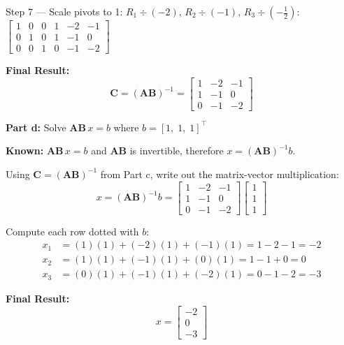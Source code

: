 \documentclass{article}
\begin{document}
\begin{aprob}
    \medskip
    Step 7 --- Scale pivots to 1: $R_1 \div (-2)$, $R_2 \div (-1)$, $R_3 \div (-\frac{1}{2})$:
    $\left[\begin{array}{ccc|ccc} 1 & 0 & 0 & 1 & -2 & -1 \\ 0 & 1 & 0 & 1 & -1 & 0 \\ 0 & 0 & 1 & 0 & -1 & -2 \end{array}\right]$

    \medskip
    \textbf{Final Result:}
    \[
        \boxed{\mathbf{C} = (\mathbf{AB})^{-1} = \begin{bmatrix} 1 & -2 & -1 \\ 1 & -1 & 0 \\ 0 & -1 & -2 \end{bmatrix}}
    \]

    \bigskip
    \begin{mdframed}
    \textbf{\large Part d:} Solve $\mathbf{AB}\,x = b$ where $b = [1,\;1,\;1]^\top$
    \end{mdframed}

    \textbf{Known:} $\mathbf{AB}\,x = b$ and $\mathbf{AB}$ is invertible, therefore $x = (\mathbf{AB})^{-1} b$.

    \medskip
    Using $\mathbf{C} = (\mathbf{AB})^{-1}$ from Part c, write out the matrix-vector multiplication:
    \[
        x = (\mathbf{AB})^{-1} b = \begin{bmatrix} 1 & -2 & -1 \\ 1 & -1 & 0 \\ 0 & -1 & -2 \end{bmatrix} \begin{bmatrix} 1 \\ 1 \\ 1 \end{bmatrix}
    \]

    Compute each row dotted with $b$:
    \begin{align*}
        x_1 &= (1)(1) + (-2)(1) + (-1)(1) = 1 - 2 - 1 = -2 \\
        x_2 &= (1)(1) + (-1)(1) + (0)(1) = 1 - 1 + 0 = 0 \\
        x_3 &= (0)(1) + (-1)(1) + (-2)(1) = 0 - 1 - 2 = -3
    \end{align*}

    \textbf{Final Result:}
    \[
        \boxed{x = \begin{bmatrix} -2 \\ 0 \\ -3 \end{bmatrix}}
    \]

\end{aprob}
\end{document}
